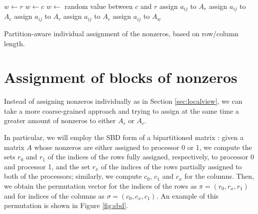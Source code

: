 \begin{algorithm}[h]
	\begin{algorithmic}
		\State
		\State $w \gets r$ 
		\State $w \gets c$
		\Else
		\State $w \gets$ random value between $c$ and $r$
		\EndIf
		\State assign $a_{ij}$ to $A_r$
		\State assign $a_{ij}$ to $A_c$
		\Else
		\State assign $a_{ij}$ to $A_r$
		\State assign $a_{ij}$ to $A_c$
		\Else
		\State assign $a_{ij}$ to $A_w$
		\EndIf
		\EndIf
		\EndFor
	\end{algorithmic}
	\caption{Partition-aware individual assignment of the nonzeros, based on row/column length.} \label{alg:localview-pa}
\end{algorithm}

\section{Assignment of blocks of nonzeros} \label{sec:sbd}

Instead of assigning nonzeros individually as in Section \ref{sec:localview}, we can take a more coarse-grained approach and trying to assign at the same time a greater amount of nonzeros to either $A_r$ or $A_c$. 

In particular, we will employ the SBD form of a bipartitioned matrix \cite{yzelman_cache}: given a matrix $A$ whose nonzeros are either assigned to processor 0 or 1, we compute the sets $r_0$ and $r_1$ of the indices of the rows fully assigned, respectively, to processor 0 and processor 1, and the set $r_x$ of the indices of the rows partially assigned to both of the processors; similarly, we compute $c_0$, $c_1$ and $c_x$ for the columns. Then, we obtain the permutation vector for the indices of the rows as $\pi = (r_0,r_x,r_1)$ and for indices of the columns as $\sigma = (c_0,c_x,c_1)$. An example of this permutation is shown in Figure \ref{fig:sbd}.

